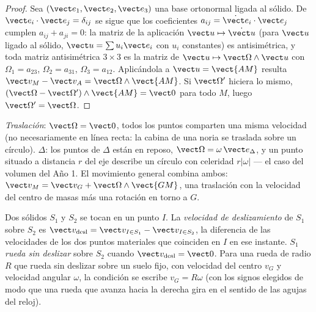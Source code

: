 \begin{proof}
Sea $(\vect e_1, \vect e_2, \vect e_3)$ una base ortonormal ligada al
sólido. De $\vect e_i\cdot\vect e_j = \delta_{ij}$ se sigue que los
coeficientes $a_{ij} = \dot{\vect e}_i\cdot\vect e_j$ cumplen
$a_{ij} + a_{ji} = 0$: la matriz de la aplicación
$\vect u \mapsto \dot{\vect u}$ (para $\vect u$ ligado al sólido,
$\vect u = \sum u_i\vect e_i$ con $u_i$ constantes) es antisimétrica, y
toda matriz antisimétrica $3\times3$ es la matriz de
$\vect u \mapsto \vect\Omega\wedge\vect u$ con $\Omega_1 = a_{23}$,
$\Omega_2 = a_{31}$, $\Omega_3 = a_{12}$. Aplicándola a $\vect u =
\vect{AM}$ resulta $\vect v_M - \vect v_A = \vect\Omega\wedge\vect{AM}$. Si
$\vect\Omega'$ hiciera lo mismo, $(\vect\Omega - \vect\Omega')\wedge
\vect{AM} = \vect 0$ para todo $M$, luego $\vect\Omega' = \vect\Omega$.
\end{proof}

\begin{remark}\label{rem:b2:rigid-body-mechanics:motions}
\emph{Traslación}: $\vect\Omega = \vect 0$, todos los puntos comparten una
misma velocidad (no necesariamente en línea recta: la cabina de una noria
se traslada sobre un círculo). \emph{}
$\Delta$: los puntos de $\Delta$ están en reposo,
$\vect\Omega = \omega\,\vect e_\Delta$, y un punto situado a distancia
$r$ del eje describe un círculo con celeridad $r|\omega|$ --- el caso del
volumen del Año 1. El movimiento general combina ambos:
$\vect v_M = \vect v_G + \vect\Omega\wedge\vect{GM}$, una traslación con la
velocidad del centro de masas más una rotación en torno a $G$.
\end{remark}

\begin{definition}\label{def:b2:rigid-body-mechanics:rolling}
Dos sólidos $S_1$ y $S_2$ se tocan en un punto $I$. La \emph{velocidad de
deslizamiento} de $S_1$ sobre $S_2$ es $\vect v_{\text{desl}} = \vect v_{I \in S_1}
- \vect v_{I \in S_2}$, la diferencia de las velocidades de los dos puntos
materiales que coinciden en $I$ en ese instante. $S_1$ \emph{rueda sin
deslizar} sobre $S_2$ cuando $\vect v_{\text{desl}} = \vect 0$. Para una
rueda de radio $R$ que rueda sin deslizar sobre un suelo fijo, con
velocidad del centro $v_G$ y velocidad angular $\omega$, la condición se
escribe $v_G = R\omega$ (con los signos elegidos de modo que una rueda que
avanza hacia la derecha gira en el sentido de las agujas del reloj).
\end{definition}

